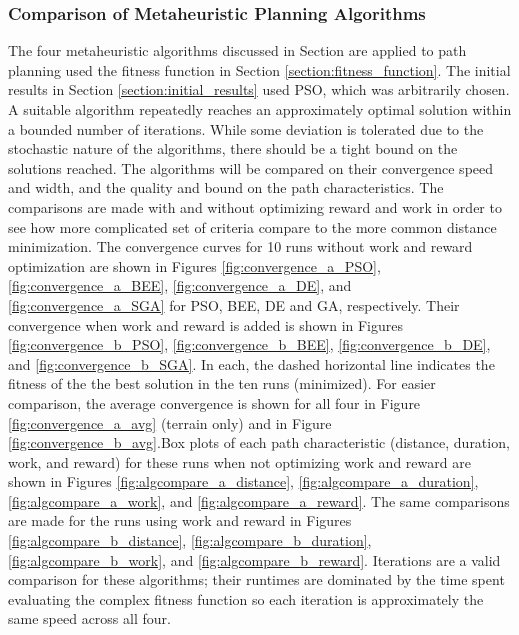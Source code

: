 \documentclass{tamuccthesis}
\begin{document}
\subsubsection{Comparison of Metaheuristic Planning Algorithms}

The four metaheuristic algorithms discussed in Section \label{section:goto} are applied to path planning used the fitness function in Section \ref{section:fitness_function}. The initial results in Section \ref{section:initial_results} used PSO, which was arbitrarily chosen. A suitable algorithm repeatedly reaches an approximately optimal solution within a bounded number of iterations. While some deviation is tolerated due to the stochastic nature of the algorithms, there should be a tight bound on the solutions reached. The algorithms will be compared on their convergence speed and width, and the quality and bound on the path characteristics. The comparisons are made with and without optimizing reward and work in order to see how more complicated set of criteria compare to the more common distance minimization. The convergence curves for 10 runs without work and reward optimization are shown in Figures \ref{fig:convergence_a_PSO}, \ref{fig:convergence_a_BEE}, \ref{fig:convergence_a_DE}, and \ref{fig:convergence_a_SGA} for PSO, BEE, DE and GA, respectively. Their convergence when work and reward is added is shown in Figures \ref{fig:convergence_b_PSO}, \ref{fig:convergence_b_BEE}, \ref{fig:convergence_b_DE}, and \ref{fig:convergence_b_SGA}. In each, the dashed horizontal line indicates the fitness of the the best solution in the ten runs (minimized). For easier comparison, the average convergence is shown for all four in Figure \ref{fig:convergence_a_avg} (terrain only) and in Figure \ref{fig:convergence_b_avg}.Box plots of each path characteristic (distance, duration, work, and reward) for these runs when not optimizing work and reward are shown in Figures \ref{fig:algcompare_a_distance}, \ref{fig:algcompare_a_duration}, \ref{fig:algcompare_a_work}, and \ref{fig:algcompare_a_reward}. The same comparisons are made for the runs using work and reward in Figures \ref{fig:algcompare_b_distance}, \ref{fig:algcompare_b_duration}, \ref{fig:algcompare_b_work}, and \ref{fig:algcompare_b_reward}. Iterations are a valid comparison for these algorithms; their runtimes are dominated by the time spent evaluating the complex fitness function so each iteration is approximately the same speed across all four. 
\end{document}
